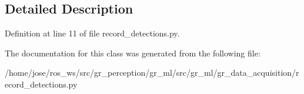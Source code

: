 \subsection{Detailed Description}


Definition at line 11 of file record\+\_\+detections.\+py.



The documentation for this class was generated from the following file\+:\begin{DoxyCompactItemize}
\item 
/home/jose/ros\+\_\+ws/src/gr\+\_\+perception/gr\+\_\+ml/src/gr\+\_\+ml/gr\+\_\+data\+\_\+acquisition/record\+\_\+detections.\+py\end{DoxyCompactItemize}
